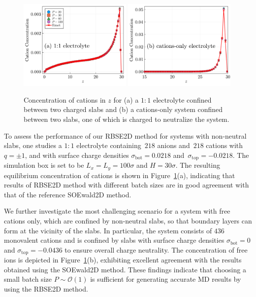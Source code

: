 \begin{figure}[ht]
	\centering
	\includegraphics[width=0.49\textwidth]{figs/hist_Ez.pdf} 
	\includegraphics[width=0.49\textwidth]{figs/hist_cation.pdf}
	\caption{
		Concentration of cations in $z$ for (a) a $1:1$ electrolyte confined between two charged slabs and (b) a cations-only system confined between two slabs, one of which is charged to neutralize the system. 
	}
	\label{fig:Ez_density}
\end{figure}


To assess the performance of our RBSE2D method for systems with non-neutral slabs, one studies
a $1:1$ electrolyte containing~$218$ anions and~$218$ cations with~$q = \pm 1$, and with surface charge densities $\sigma_{\mathrm{bot}}=0.0218$ and~$\sigma_{\mathrm{top}}=-0.0218$. The simulation box is set to be $L_x = L_y = 100 \sigma$ and $H = 30 \sigma$.
The resulting equilibrium concentration of cations is shown in Figure~\ref{fig:Ez_density}(a), indicating that results of RBSE2D method with different batch sizes are in good agreement with that of the reference SOEwald2D method. 

We further investigate the most challenging scenario for a system with free cations only, which are confined by non-neutral slabs, so that boundary layers can form at the vicinity of the slabs. 
In particular, the system consists of $436$ monovalent cations and is confined by slabs with surface charge densities $\sigma_{\mathrm{bot}}=0$ and $\sigma_{\mathrm{top}}=-0.0436$ to ensure overall charge neutrality. The concentration of free ions is depicted in Figure~\ref{fig:Ez_density}(b), exhibiting excellent agreement with the results obtained using the SOEwald2D method. 
These findings indicate that choosing a small batch size $P\sim\mathcal O(1)$ is sufficient for generating accurate MD results by using the RBSE2D method.

